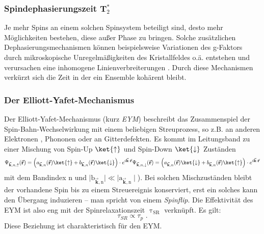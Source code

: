 \subsubsection{Spindephasierungszeit T$_2^*$}
Je mehr Spins an einem solchen Spinsystem beteiligt sind, desto mehr Möglichkeiten bestehen, diese außer Phase zu bringen. Solche zusätzlichen Dephasierungsmechanismen können beispielsweise Variationen des g-Faktors durch mikroskopische Unregelmäßigkeiten des Kristallfeldes o.ä. entstehen und verursachen eine inhomogene Linienverbreiterungen \cite{Fabian.2007}. Durch diese Mechanismen verkürzt sich die Zeit in der ein Ensemble kohärent bleibt.
\subsubsection{Der Elliott-Yafet-Mechanismus}
Der Elliott-Yafet-Mechanismus (kurz \textit{EYM})\cite{Elliott.1954,Yafet.1963} beschreibt das Zusammenspiel der Spin-Bahn-Wechselwirkung mit einem beliebigen Streuprozess, so z.B. an anderen Elektronen \cite{Boguslawski.1980}, Phononen oder an Gitterdefekten. Es kommt im Leitungsband zu einer Mischung von Spin-Up $\ket{\uparrow}$ und Spin-Down $\ket{\downarrow}$ Zuständen
\begin{equation}
\Psi_{\vec{\textbf{k}},n,\uparrow}(\vec{\textbf{r}})=\left( a_{\vec{\textbf{k}},n}(\vec{\textbf{r}})\ket{\uparrow} + b_{\vec{\textbf{k}},n}(\vec{\textbf{r}})\ket{\downarrow}\right)\cdot e^{i \vec{\textbf{k}}\cdot \vec{\textbf{r}}}\\
\Psi_{\vec{\textbf{k}},n,\downarrow}(\vec{\textbf{r}})=\left( a_{\vec{\textbf{k}},n}(\vec{\textbf{r}})\ket{\downarrow} + b_{\vec{\textbf{k}},n}(\vec{\textbf{r}})\ket{\uparrow}\right)\cdot e^{i \vec{\textbf{k}}\cdot \vec{\textbf{r}}}
\end{equation}
mit dem Bandindex n und $\mid\text{b}_{\vec{\textbf{k}},\text{n}}\mid \ll \mid\text{a}_{\vec{\textbf{k}},\text{n}}\mid$). Bei solchen Mischzuständen bleibt der vorhandene Spin bis zu einem Streuereignis konserviert, erst ein solches kann den Übergang induzieren – man spricht von einem \textit{Spinflip}. Die Effektivität des EYM ist also eng mit der Spinrelaxationszeit $\uptau_\text{SR}$ verknüpft. Es gilt: 
\begin{equation}
\tau_{SR} \propto \tau_{p} \text{ .}
\end{equation}
Diese Beziehung ist charakteristisch für den EYM. %
